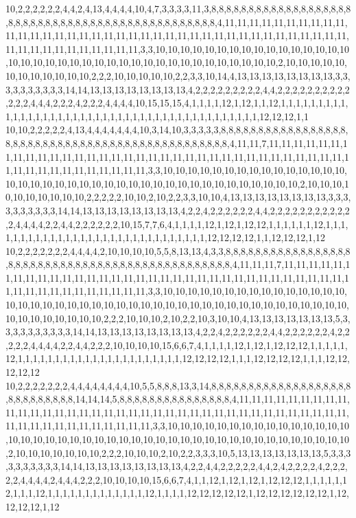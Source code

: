 10,2,2,2,2,2,2,4,4,2,4,13,4,4,4,4,10,4,7,3,3,3,3,11,3,8,8,8,8,8,8,8,8,8,8,8,8,8,8,8,8,8,8,8,8,8,8,8,8,8,8,8,8,8,8,8,8,8,8,8,8,8,8,8,8,8,8,8,8,8,8,8,4,11,11,11,11,11,11,11,11,11,11,11,11,11,11,11,11,11,11,11,11,11,11,11,11,11,11,11,11,11,11,11,11,11,11,11,11,11,11,11,11,11,11,11,11,11,11,11,11,11,3,3,10,10,10,10,10,10,10,10,10,10,10,10,10,10,10,10,10,10,10,10,10,10,10,10,10,10,10,10,10,10,10,10,10,10,10,10,10,10,2,10,10,10,10,10,10,10,10,10,10,10,10,2,2,2,10,10,10,10,10,2,2,3,3,10,14,4,13,13,13,13,13,13,13,13,3,3,3,3,3,3,3,3,3,3,14,14,13,13,13,13,13,13,13,13,4,2,2,2,2,2,2,2,2,2,4,4,2,2,2,2,2,2,2,2,2,2,2,2,2,4,4,4,2,2,2,4,2,2,2,4,4,4,4,10,15,15,15,4,1,1,1,1,12,1,12,1,1,12,1,1,1,1,1,1,1,1,1,1,1,1,1,1,1,1,1,1,1,1,1,1,1,1,1,1,1,1,1,1,1,1,1,1,1,1,1,1,1,1,1,1,1,12,12,12,1,1
10,10,2,2,2,2,2,4,13,4,4,4,4,4,4,4,10,3,14,10,3,3,3,3,3,8,8,8,8,8,8,8,8,8,8,8,8,8,8,8,8,8,8,8,8,8,8,8,8,8,8,8,8,8,8,8,8,8,8,8,8,8,8,8,8,8,8,8,8,8,8,8,4,11,11,7,11,11,11,11,11,11,11,11,11,11,11,11,11,11,11,11,11,11,11,11,11,11,11,11,11,11,11,11,11,11,11,11,11,11,11,11,11,11,11,11,11,11,11,11,11,11,3,3,10,10,10,10,10,10,10,10,10,10,10,10,10,10,10,10,10,10,10,10,10,10,10,10,10,10,10,10,10,10,10,10,10,10,10,10,10,10,10,2,10,10,10,10,10,10,10,10,10,10,2,2,2,2,2,10,10,2,10,2,2,3,3,10,10,4,13,13,13,13,13,13,13,13,3,3,3,3,3,3,3,3,3,3,14,14,13,13,13,13,13,13,13,13,4,2,2,4,2,2,2,2,2,2,4,4,2,2,2,2,2,2,2,2,2,2,2,2,4,4,4,4,2,2,4,4,2,2,2,2,2,2,10,15,7,7,6,4,1,1,1,1,12,1,12,1,12,12,1,1,1,1,1,1,12,1,1,1,1,1,1,1,1,1,1,1,1,1,1,1,1,1,1,1,1,1,1,1,1,1,1,1,1,1,1,12,12,12,12,1,1,12,12,12,1,12
10,2,2,2,2,2,2,2,4,4,4,4,2,10,10,10,10,5,5,8,13,13,4,3,3,8,8,8,8,8,8,8,8,8,8,8,8,8,8,8,8,8,8,8,8,8,8,8,8,8,8,8,8,8,8,8,8,8,8,8,8,8,8,8,8,8,8,8,8,8,8,8,4,11,11,11,7,11,11,11,11,11,11,11,11,11,11,11,11,11,11,11,11,11,11,11,11,11,11,11,11,11,11,11,11,11,11,11,11,11,11,11,11,11,11,11,11,11,11,11,11,11,3,3,10,10,10,10,10,10,10,10,10,10,10,10,10,10,10,10,10,10,10,10,10,10,10,10,10,10,10,10,10,10,10,10,10,10,10,10,10,10,10,10,10,10,10,10,10,10,10,10,10,10,10,2,2,2,10,10,10,2,10,2,2,10,3,10,10,4,13,13,13,13,13,13,13,5,3,3,3,3,3,3,3,3,3,3,14,14,13,13,13,13,13,13,13,13,4,2,2,4,2,2,2,2,2,2,4,4,2,2,2,2,2,2,4,2,2,2,2,2,4,4,4,4,2,2,4,4,2,2,2,10,10,10,10,15,6,6,7,4,1,1,1,1,12,1,12,1,12,12,12,1,1,1,1,1,12,1,1,1,1,1,1,1,1,1,1,1,1,1,1,1,1,1,1,1,1,1,1,12,12,12,12,1,1,1,12,12,12,12,1,1,1,12,12,12,12,12
10,2,2,2,2,2,2,2,4,4,4,4,4,4,4,4,10,5,5,8,8,8,13,3,14,8,8,8,8,8,8,8,8,8,8,8,8,8,8,8,8,8,8,8,8,8,8,8,8,8,8,8,8,14,14,14,5,8,8,8,8,8,8,8,8,8,8,8,8,8,8,8,4,11,11,11,11,11,11,11,11,11,11,11,11,11,11,11,11,11,11,11,11,11,11,11,11,11,11,11,11,11,11,11,11,11,11,11,11,11,11,11,11,11,11,11,11,11,11,11,11,11,3,3,10,10,10,10,10,10,10,10,10,10,10,10,10,10,10,10,10,10,10,10,10,10,10,10,10,10,10,10,10,10,10,10,10,10,10,10,10,10,10,10,10,10,10,2,10,10,10,10,10,10,10,2,2,2,10,10,10,2,10,2,2,3,3,3,10,5,13,13,13,13,13,13,13,5,3,3,3,3,3,3,3,3,3,3,14,14,13,13,13,13,13,13,13,13,4,2,2,4,4,2,2,2,2,2,4,4,2,4,2,2,2,2,4,2,2,2,2,2,4,4,4,4,2,4,4,4,2,2,2,10,10,10,10,15,6,6,7,4,1,1,12,1,12,1,12,1,12,12,12,1,1,1,1,1,12,1,1,1,12,1,1,1,1,1,1,1,1,1,1,1,1,1,12,1,1,1,1,12,12,12,12,12,1,12,12,12,12,12,12,1,12,12,12,12,1,12

